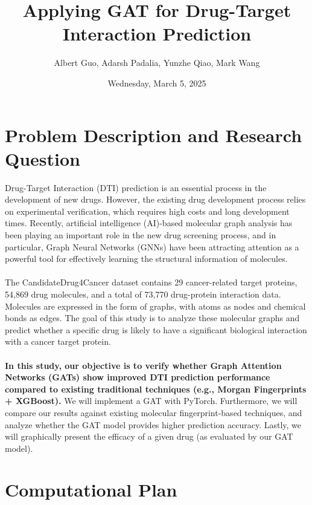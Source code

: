 \documentclass[fontsize=11pt]{article}
\title{Applying GAT for Drug-Target Interaction Prediction}
\author{Albert Guo, Adarsh Padalia, Yunzhe Qiao, Mark Wang}
\date{Wednesday, March 5, 2025}
\begin{document}
\maketitle

\section*{Problem Description and Research Question}
Drug-Target Interaction (DTI) prediction is an essential process in the development of new drugs. However, the existing drug development process relies on experimental verification, which requires high costs and long development times. Recently, artificial intelligence (AI)-based molecular graph analysis has been playing an important role in the new drug screening process, and in particular, Graph Neural Networks (GNNs) have been attracting attention as a powerful tool for effectively learning the structural information of molecules.
\\~\\
The CandidateDrug4Cancer dataset contains 29 cancer-related target proteins, 54,869 drug molecules, and a total of 73,770 drug-protein interaction data. Molecules are expressed in the form of graphs, with atoms as nodes and chemical bonds as edges. The goal of this study is to analyze these molecular graphs and predict whether a specific drug is likely to have a significant biological interaction with a cancer target protein.
\\~\\
\textbf{In this study, our objective is to verify whether Graph Attention Networks (GATs) show improved DTI prediction performance compared to existing traditional techniques (e.g., Morgan Fingerprints + XGBoost).} We will implement a GAT with PyTorch. Furthermore, we will compare our results against existing molecular fingerprint-based techniques, and analyze whether the GAT model provides higher prediction accuracy. Lastly, we will graphically present the efficacy of a given drug (as evaluated by our GAT model).

\section*{Computational Plan}
\end{document}
